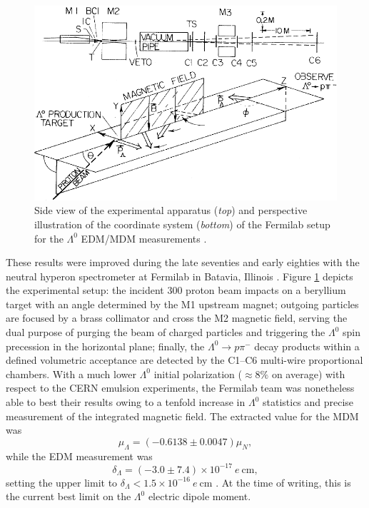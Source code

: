 \begin{figure}[t]
	\centering
	\includegraphics[width=.7\textwidth]{graphics/01-standard_model/fermilab_edm_setup.png}
	\caption[Side view of the experimental apparatus and perspective illustration of the coordinate system of the Fermilab setup for the $\Lambda^0$ EDM/MDM measurements.]{Side view of the experimental apparatus (\textit{top}) and perspective illustration of the coordinate system (\textit{bottom}) of the Fermilab setup for the $\Lambda^0$ EDM/MDM measurements \cite{PhysRevLett.41.1348}.}
	\label{fig:1:fermilab_edm_setup}
\end{figure}

These results were improved during the late seventies and early eighties with the neutral hyperon spectrometer at Fermilab in Batavia, Illinois \cite{PhysRevLett.41.1348} \cite{PhysRevD.23.814}.
Figure \ref{fig:1:fermilab_edm_setup} depicts the experimental setup: the incident \SI{300}{\gev} proton beam impacts on a beryllium target with an angle determined by the M1 upstream magnet;
outgoing particles are focused by a brass collimator and cross the M2 magnetic field, serving the dual purpose of purging the beam of charged particles and triggering the $\Lambda^0$ spin precession in the horizontal plane;
finally, the $\Lambda^0 \rightarrow p\pi^-$ decay products within a defined volumetric acceptance are detected by the C1--C6 multi-wire proportional chambers.
With a much lower $\Lambda^0$ initial polarization ($\approx 8\%$ on average) with respect to the CERN emulsion experiments, the Fermilab team was nonetheless able to best their results owing to a tenfold increase in $\Lambda^0$ statistics and precise measurement of the integrated magnetic field. The extracted value for the MDM \cite{PhysRevLett.41.1348} was
\begin{equation}
\mu_\Lambda = \left( -0.6138 \pm 0.0047 \right) \mu_N,
\end{equation}
while the EDM measurement \cite{PhysRevD.23.814} was
\begin{equation}
\delta_\Lambda = \left( -3.0 \pm 7.4 \right)\times {10}^{-17}~e~\si{\centi\meter},
\end{equation}
setting the upper limit to $\delta_\Lambda < 1.5\times{10}^{-16}~e~\si{\centi\meter}$ \cite{PDG}.
At the time of writing, this is the current best limit on the $\Lambda^0$ electric dipole moment.


